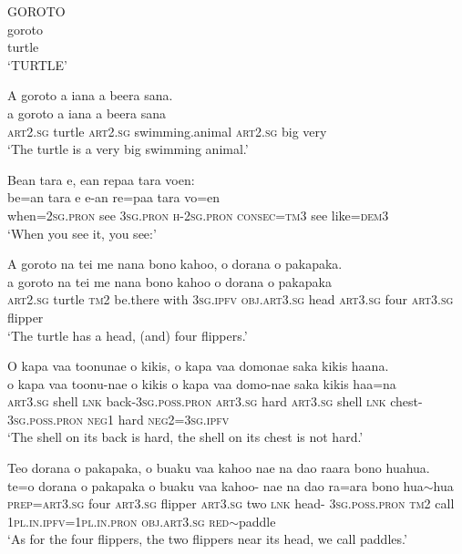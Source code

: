\ea\label{ex:text19-1}
GOROTO\\
\gll goroto\\
     turtle\\
\glt `TURTLE'
\z

\ea\label{ex:text19-2}
A goroto a iana a beera sana.\\
\gll a	goroto	a	iana	a	beera	sana\\
     \textsc{art}2.\textsc{sg}	turtle	\textsc{art}2.\textsc{sg}	swimming.animal	\textsc{art}2.\textsc{sg}	big	very\\
\glt `The turtle is a very big swimming animal.'
\z

\ea\label{ex:text19-3}
Bean tara e, ean repaa tara voen:\\
\gll be=an	tara	e	e-an	re=paa	tara	vo=en\\
     when=2\textsc{sg}.\textsc{pron}	see	3\textsc{sg}.\textsc{pron}	\textsc{h}-2\textsc{sg}.\textsc{pron}	\textsc{consec}=\textsc{tm}3	see	like=\textsc{dem}3\\
\glt `When you see it, you see:'
\z

\ea\label{ex:text19-4}
A goroto na tei me nana bono kahoo, o dorana o pakapaka.\\
\gll a	goroto	na	tei	me	nana	bono	kahoo	o	dorana	o	pakapaka\\
     \textsc{art}2.\textsc{sg}	turtle	\textsc{tm}2	be.there	with	3\textsc{sg}.\textsc{ipfv}	\textsc{obj}.\textsc{art}3.\textsc{sg}	head	\textsc{art}3.\textsc{sg}	four	\textsc{art}3.\textsc{sg}	flipper\\
\glt `The turtle has a head, (and) four flippers.'
\z

\ea\label{ex:text19-5}
O kapa vaa toonunae o kikis, o kapa vaa domonae saka kikis haana.\\
\gll o	kapa	vaa	toonu-nae	o	kikis	o	kapa	vaa	domo-nae	saka	kikis	haa=na\\
     \textsc{art}3.\textsc{sg}	shell	\textsc{lnk}	back-3\textsc{sg}.\textsc{poss}.\textsc{pron}	\textsc{art}3.\textsc{sg}	hard	\textsc{art}3.\textsc{sg}	shell	\textsc{lnk}	chest-3\textsc{sg}.\textsc{poss}.\textsc{pron}	\textsc{neg}1	hard	\textsc{neg}2=3\textsc{sg}.\textsc{ipfv}\\
\glt `The shell on its back is hard, the shell on its chest is not hard.'
\z

\ea\label{ex:text19-6}
Teo dorana o pakapaka, o buaku vaa kahoo nae na dao raara bono huahua.\\
\gll te=o	dorana	o	pakapaka	o	buaku	vaa	kahoo-	nae	na	dao	ra=ara	bono	hua{$\sim$}hua\\
     \textsc{prep}=\textsc{art}3.\textsc{sg}	four	\textsc{art}3.\textsc{sg}	flipper	\textsc{art}3.\textsc{sg}	two	\textsc{lnk}	head-	3\textsc{sg}.\textsc{poss}.\textsc{pron}	\textsc{tm}2	call	1\textsc{pl}.\textsc{in}.\textsc{ipfv}=1\textsc{pl}.\textsc{in}.\textsc{pron}	\textsc{obj}.\textsc{art}3.\textsc{sg}	\textsc{red}{$\sim$}paddle\\
\glt `As for the four flippers, the two flippers near its head, we call paddles.'
\z

